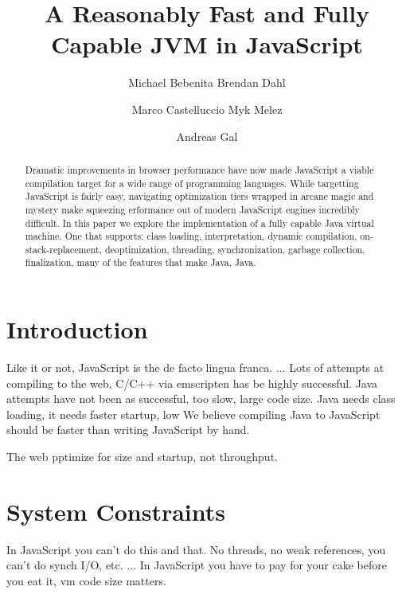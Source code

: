 \documentclass{acm_proc_article-sp}
\begin{document}
\title{A Reasonably Fast and Fully Capable JVM in JavaScript}

\author{
\alignauthor Michael Bebenita
\alignauthor Brendan Dahl
\and
\alignauthor Marco Castelluccio
\alignauthor Myk Melez
\and
\alignauthor Andreas Gal
}

\maketitle
\begin{abstract}
Dramatic improvements in browser performance have now made JavaScript a viable compilation target for a wide range of programming languages.
While targetting JavaScript is fairly easy, navigating optimization tiers wrapped in arcane magic and mystery make squeezing erformance out of modern JavaScript engines incredibly difficult.
In this paper we explore the implementation of a fully capable Java virtual machine. One that supports: class loading, interpretation, dynamic compilation, on-stack-replacement, deoptimization, threading, synchronization, garbage collection, finalization, many of the features that make Java, Java.
\end{abstract}




\section{Introduction}

Like it or not, JavaScript is the de facto lingua franca. ...
Lots of attempts at compiling to the web, C/C++ via emscripten has be highly successful.
Java attempts have not been as successful, too slow, large code size.
Java needs class loading, it needs faster startup, low 
We believe compiling Java to JavaScript should be faster than writing JavaScript by hand.

The web pptimize for size and startup, not throughput.

\section{System Constraints}

In JavaScript you can't do this and that. No threads, no weak references, you can't do synch I/O, etc. ...
In JavaScript you have to pay for your cake before you eat it, vm code size matters.
\end{document}
